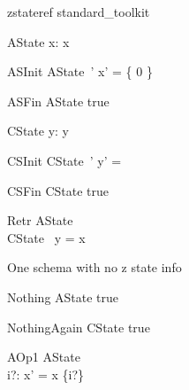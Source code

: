 
\begin{zsection}
   \SECTION zstateref \parents standard\_toolkit
\end{zsection}

\begin{schema}{AState}
   x: \power \nat
\where
  x \neq \emptyset
\end{schema}

\begin{schema}{ASInit}
   AState~'
\where
   x' = \{ 0 \}
\end{schema}

\begin{schema}{ASFin}
   AState
\where
   true
\end{schema}

\begin{schema}{CState}
  y: \seq \nat
\where
   y \neq \langle \rangle
\end{schema}

\begin{schema}{CSInit}
   CState~'
\where
  y' =  \rangle
\end{schema}

\begin{schema}{CSFin}
   CState
\where
   true
\end{schema}

\begin{schema}{Retr}
   AState \\
   CState
\where
   \ran~y = x
\end{schema}

One schema with no z state info
\begin{schema}{Nothing}
   \Delta AState
\where
   true
\end{schema}

\begin{schema}{NothingAgain}
   \Delta CState
\where
   true
\end{schema}

\begin{schema}{AOp1}
   \Delta AState \\
   i?: \nat
\where
   x' = x \cup \{i?\}
\end{schema}

